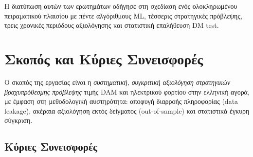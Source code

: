\medskip
Η διατύπωση αυτών των ερωτημάτων οδήγησε στη σχεδίαση ενός ολοκληρωμένου
πειραματικού πλαισίου με πέντε αλγόριθμους ML, τέσσερις στρατηγικές πρόβλεψης,
τρεις χρονικές περιόδους αξιολόγησης και στατιστική επαλήθευση DM test.


\section{Σκοπός και Κύριες Συνεισφορές}
\label{sec:purpose}

Ο σκοπός της εργασίας είναι η \textit{συστηματική, συγκριτική αξιολόγηση
στρατηγικών βραχυπρόθεσμης πρόβλεψης} τιμής DAM και ηλεκτρικού φορτίου στην
ελληνική αγορά, με έμφαση στη μεθοδολογική αυστηρότητα: αποφυγή διαρροής
πληροφορίας (data leakage), ακέραια αξιολόγηση εκτός δείγματος (out-of-sample)
και στατιστικά έγκυρη σύγκριση.

\subsection*{Κύριες Συνεισφορές}

